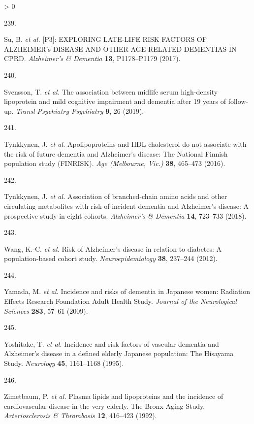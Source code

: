 \documentclass[a4paper, twoside]{templates/ociamthesis}
\newlength{\cslhangindent}
\newlength{\csllabelwidth}
\newenvironment{CSLReferences}[3] %
 {%
  \setlength{\parindent}{0pt}
  \ifodd #1 \everypar{\setlength{\hangindent}{\cslhangindent}}\ignorespaces\fi
  \ifnum #2 > 0
  \setlength{\parskip}{#2\baselineskip}
  \fi
 }%
 {}
\newcommand{\CSLLeftMargin}[1]{\parbox[t]{\maxof{\widthof{#1}}{\csllabelwidth}}{#1}}
\newcommand{\CSLRightInline}[1]{\parbox[t]{\linewidth - \csllabelwidth}{#1}}
\begin{document}
\begin{CSLReferences}{0}{0}
\leavevmode\hypertarget{ref-su2017}{}%
\CSLLeftMargin{239. }
\CSLRightInline{Su, B. \emph{et al.} {[}{P3}{}{]}: {EXPLORING LATE}-{LIFE RISK FACTORS OF ALZHEIMER}'s {DISEASE AND OTHER AGE}-{RELATED DEMENTIAS IN CPRD}. \emph{Alzheimer's \& Dementia} \textbf{13}, P1178--P1179 (2017).}

\leavevmode\hypertarget{ref-svensson2019}{}%
\CSLLeftMargin{240. }
\CSLRightInline{Svensson, T. \emph{et al.} The association between midlife serum high-density lipoprotein and mild cognitive impairment and dementia after 19 years of follow-up. \emph{Transl Psychiatry Psychiatry} \textbf{9}, 26 (2019).}

\leavevmode\hypertarget{ref-tynkkynen2016}{}%
\CSLLeftMargin{241. }
\CSLRightInline{Tynkkynen, J. \emph{et al.} Apolipoproteins and {HDL} cholesterol do not associate with the risk of future dementia and {Alzheimer}'s disease: The {National Finnish} population study ({FINRISK}). \emph{Age (Melbourne, Vic.)} \textbf{38}, 465--473 (2016).}

\leavevmode\hypertarget{ref-tynkkynen2018}{}%
\CSLLeftMargin{242. }
\CSLRightInline{Tynkkynen, J. \emph{et al.} Association of branched-chain amino acids and other circulating metabolites with risk of incident dementia and {Alzheimer}'s disease: A prospective study in eight cohorts. \emph{Alzheimer's \& Dementia} \textbf{14}, 723--733 (2018).}

\leavevmode\hypertarget{ref-wang2012}{}%
\CSLLeftMargin{243. }
\CSLRightInline{Wang, K.-C. \emph{et al.} Risk of {Alzheimer}'s disease in relation to diabetes: A population-based cohort study. \emph{Neuroepidemiology} \textbf{38}, 237--244 (2012).}

\leavevmode\hypertarget{ref-yamada2009}{}%
\CSLLeftMargin{244. }
\CSLRightInline{Yamada, M. \emph{et al.} Incidence and risks of dementia in {Japanese} women: Radiation {Effects Research Foundation Adult Health Study}. \emph{Journal of the Neurological Sciences} \textbf{283}, 57--61 (2009).}

\leavevmode\hypertarget{ref-yoshitake1995}{}%
\CSLLeftMargin{245. }
\CSLRightInline{Yoshitake, T. \emph{et al.} Incidence and risk factors of vascular dementia and {Alzheimer}'s disease in a defined elderly {Japanese} population: The {Hisayama Study}. \emph{Neurology} \textbf{45}, 1161--1168 (1995).}

\leavevmode\hypertarget{ref-zimetbaum1992}{}%
\CSLLeftMargin{246. }
\CSLRightInline{Zimetbaum, P. \emph{et al.} Plasma lipids and lipoproteins and the incidence of cardiovascular disease in the very elderly. {The Bronx Aging Study}. \emph{Arteriosclerosis \& Thrombosis} \textbf{12}, 416--423 (1992).}


\end{CSLReferences}
\end{document}
